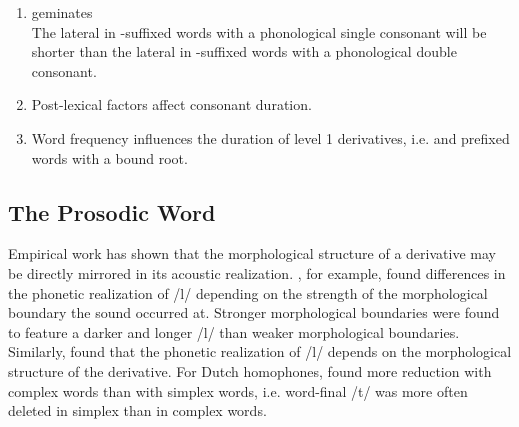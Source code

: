 \begin{enumerate}
		
	\item  {} geminates \\
	The lateral in -suffixed words with a phonological single consonant will be shorter than the lateral in  -suffixed words with a phonological double consonant. 
	
	\item Post-lexical factors affect consonant duration.
	


	\item Word frequency influences the duration of level 1 derivatives, i.e.  and prefixed words with a bound root.
	
\end{enumerate}



\subsection{The Prosodic Word} {\label{prosodic word}}


Empirical work has shown that the morphological structure of a derivative may be directly mirrored in its acoustic realization. %
\cite{Sproat.1993b}, for example, found differences in the phonetic realization of /l/ depending on the strength of the morphological boundary the sound occurred at. Stronger morphological boundaries were found to feature a darker and longer /l/ than weaker morphological boundaries. Similarly, \cite{LeeKim.2013} found that the phonetic realization of /l/ depends on the morphological structure of the derivative. 
For Dutch homophones, \cite{Schuppler.2012} found more reduction with complex words than with simplex words, i.e. word-final /t/ was more often deleted in simplex than in complex words.

